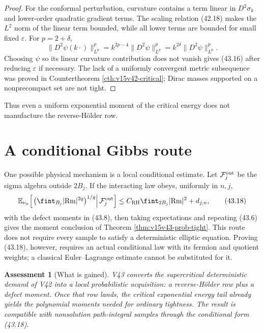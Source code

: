 \documentclass[11pt]{article}
\newtheorem{assessment}[theorem]{Assessment}
\theoremstyle{remark}
\begin{document}
\begin{proof}
For the conformal perturbation, curvature contains a term linear in
\(D^2\sigma_k\) and lower-order quadratic gradient terms.  The
scaling relation (42.18) makes the \(L^2\) norm of the linear term
bounded, while all lower terms are bounded for small fixed
\(\varepsilon\).  For \(p=2+\delta\),
\[
 \|D^2\psi(k\cdot)\|_{L^p}^p
 =k^{2p-4}\|D^2\psi\|_{L^p}^p
 =k^{2\delta}\|D^2\psi\|_{L^p}^p.                       \tag{43.17}
\]
Choosing \(\psi\) so its linear curvature contribution does not
vanish gives (43.16) after reducing \(\varepsilon\) if necessary.
The lack of a uniformly convergent metric subsequence was proved in
Countertheorem \ref{cth:v15v42-critical}; Dirac masses supported on
a nonprecompact set are not tight.
\end{proof}

Thus even a uniform exponential moment of the critical energy does
not manufacture the reverse-Hölder row.

\section{A conditional Gibbs route}

One possible physical mechanism is a local conditional estimate.
Let \({\cal F}_{j}^{\rm out}\) be the sigma algebra outside \(2B_j\).
If the interacting law obeys, uniformly in \(n,j\),
\[
 \mathbb E_{\nu_n}\!\left[
 \left.
 \left(\fint_{B_j}|{\rm Rm}|^{2q}\right)^{1/q}
 \right|{\cal F}_{j}^{\rm out}\right]
 \leq
 C_{\rm RH}\fint_{2B_j}|{\rm Rm}|^2+d_{j,n},             \tag{43.18}
\]
with the defect moments in (43.8), then taking expectations and
repeating (43.6) gives the moment conclusion of Theorem
\ref{thm:v15v43-prob-tight}.  This route does not require every
sample to satisfy a deterministic elliptic equation.  Proving
(43.18), however, requires an actual conditional law with its
fermion and quotient weights; a classical Euler--Lagrange estimate
cannot be substituted for it.

\begin{assessment}[What is gained]
\label{ass:v15v43-gain}
V43 converts the supercritical deterministic demand of V42 into a
local probabilistic acquisition: a reverse-Hölder row plus a defect
moment.  Once that row lands, the critical exponential energy tail
already yields the polynomial moments needed for ordinary
tightness.  The result is compatible with nonsolution path-integral
samples through the conditional form (43.18).
\end{assessment}
\end{document}
